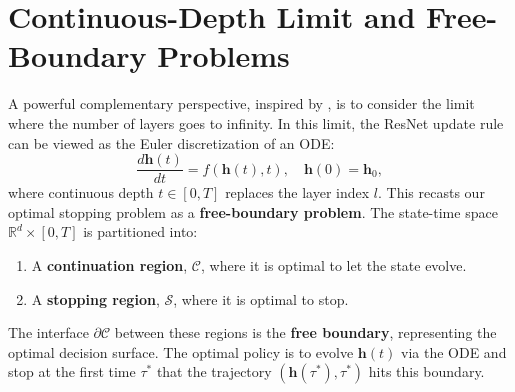 \documentclass[12pt]{imsart}
\newcommand{\R}{\mathbb{R}}
\newcommand{\h}{\mathbf{h}}
\theoremstyle{plain}
\theoremstyle{definition}
\begin{document}
\section{Continuous-Depth Limit and Free-Boundary Problems}
\label{sec:continuous}

A powerful complementary perspective, inspired by \citet{Chen2018}, is to consider the limit where the number of layers goes to infinity. In this limit, the ResNet update rule can be viewed as the Euler discretization of an ODE:
\begin{equation} \label{eq:ode}
\frac{d\h(t)}{dt} = f(\h(t), t), \quad \h(0) = \h_0,
\end{equation}
where continuous depth $t \in [0, T]$ replaces the layer index $l$. This recasts our optimal stopping problem as a \textbf{free-boundary problem}. The state-time space $\R^d \times [0, T]$ is partitioned into:
\begin{enumerate}
    \item A \textbf{continuation region}, $\mathcal{C}$, where it is optimal to let the state evolve.
    \item A \textbf{stopping region}, $\mathcal{S}$, where it is optimal to stop.
\end{enumerate}
The interface $\partial \mathcal{C}$ between these regions is the \textbf{free boundary}, representing the optimal decision surface. The optimal policy is to evolve $\h(t)$ via the ODE and stop at the first time $\tau^*$ that the trajectory $(\h(\tau^*), \tau^*)$ hits this boundary.
\end{document}

